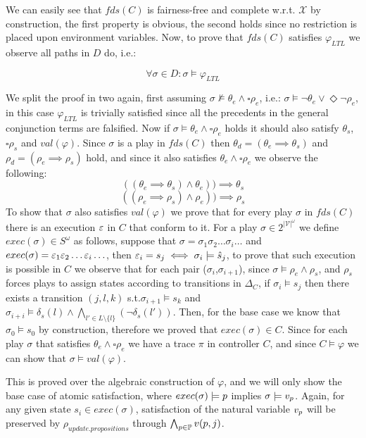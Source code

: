 We can easily see that $fds(C)$ is fairness-free and complete w.r.t. $\mathcal{X}$ by construction, the first property is obvious, the second holds since no restriction is placed upon environment variables. Now, to prove that $fds(C)$ satisfies $\varphi_{LTL}$ we observe all paths in $D$ do, i.e.:

\[\forall \sigma \in D: \sigma \models \varphi_{LTL} \]

We split the proof in two again, first assuming $\sigma \not\models \theta_e \wedge \square \rho_e$, i.e.: $\sigma \models \neg\theta_e \vee \Diamond \neg\rho_e$, in this case $\varphi_{LTL}$ is trivially satisfied since all the precedents in the general conjunction terms are falsified. Now if $\sigma \models \theta_e \wedge \square \rho_e$ holds it should also satisfy $\theta_s$, $\square\rho_s$ and $val(\varphi)$. Since $\sigma$ is a play in $fds(C)$ then $\theta_d=(\theta_e \implies \theta_s)$ and $\rho_d=(\rho_e \implies \rho_s)$ hold, and since it also satisfies $\theta_e \wedge \square \rho_e$ we observe the following:
\[((\theta_e \implies \theta_s) \wedge \theta_e))\implies \theta_s\]
\[((\rho_e \implies \rho_s) \wedge \rho_e))\implies \rho_s\]
To show that $\sigma$ also satisfies $val(\varphi)$ we prove that for every play $\sigma$ in $fds(C)$ there is an execution ${\varepsilon}$ in $C$ that conform to it.
For a play $\sigma \in 2^{|\mathcal{V}|^{\omega}}$ we define $exec(\sigma) \in S^{\omega}$ as follows, suppose that $\sigma = \sigma_1 \sigma_2 \ldots \sigma_i \ldots$ and
$exec(\sigma)= {\varepsilon}_1 {\varepsilon}_2 \ldots {\varepsilon}_i \ldots$, then ${\varepsilon}_i = s_j \iff \sigma_i \models \hat{s}_{j}$, to prove that such execution is possible in $C$ we observe that for each pair ($\sigma_i$,$\sigma_{i+1}$), since $\sigma \models \rho_e \wedge \rho_s$, and $\rho_s$ forces
plays to assign states according to transitions in $\Delta_C$, if $\sigma_i \models s_j$ then there exists a transition $(j, l, k)$ s.t.$\sigma_{i+1} \models s_k$ and $\sigma_{i+i} \models \delta_s(l) \wedge \bigwedge_{l' \in L \setminus \{l\}}(\neg \delta_s(l'))$. Then, for the base case we know that $\sigma_0 \models s_0$ by construction, therefore we proved that $exec(\sigma) \in C$.
Since for each play $\sigma$ that satisfies $\theta_e \wedge \square \rho_e$ we have a trace $\pi$ in controller $C$, and since $C \models \varphi$ we can show that $\sigma \models val(\varphi)$.


This is proved over the algebraic construction of $\varphi$, and we will only show the base case of atomic satisfaction, where
$exec(\sigma) \models {p}$ implies $\sigma \models v_{{p}}$. Again, for any given state $s_i \in exec(\sigma)$, satisfaction of the natural variable $v_{{p}}$ will be preserved by  $\rho_{update.propositions}$ through $\bigwedge_{{p} \in {\mathbb{P}}}v({p},j)$.\\
\\

